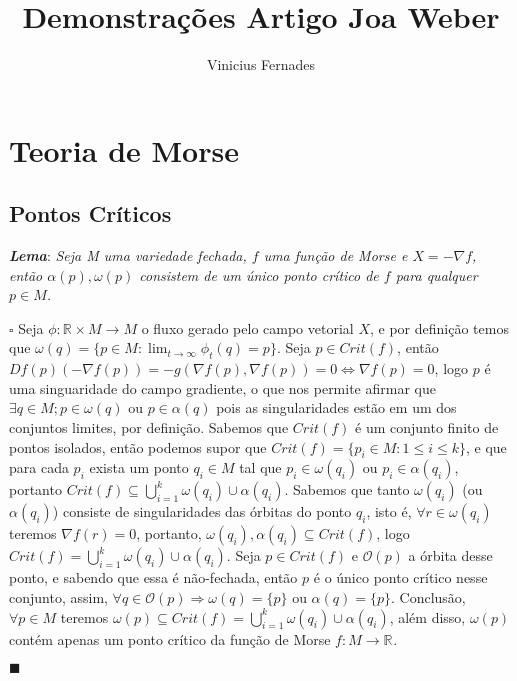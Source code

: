 \documentclass[12pt]{book}
\newcommand{\real}[1]{\mathbb{R}^{#1}}
\newcommand{\tese}[3]{\vspace{2mm} \textit{\textbf{#1}}: \textit{#2} \par $\square$ #3 \par $\blacksquare$}
\begin{document}
	
	\title{Demonstrações Artigo Joa Weber}
	
	\author{Vinicius Fernades}
	
	\maketitle
	
	
	\vspace{8mm}
	\chapter{Teoria de Morse}
	
	\section{Pontos Críticos}
	
	\tese{Lema}{Seja M uma variedade fechada, $f$ uma função de Morse e $X = -\nabla f$, então $\alpha(p), \omega(p)$ consistem de um único ponto crítico de $f$ para qualquer $p \in M$.}
	{Seja $\phi: \real{} \times M \to M$ o fluxo gerado pelo campo vetorial $X$, e por definição temos que $\omega(q) = \{p \in M: \lim_{t \to \infty}\phi_{t}(q) = p \}$. Seja $p \in Crit(f)$, então $Df(p)(-\nabla f(p)) = -g(\nabla f(p), \nabla f(p)) = 0 \iff \nabla f(p) = 0$, logo $p$ é uma singuaridade do campo gradiente, o que nos permite afirmar que $\exists q \in M; p \in  \omega(q)$ ou $p \in  \alpha(q)$ pois as singularidades estão em um dos conjuntos limites, por definição. Sabemos que $Crit(f)$ é um conjunto finito de pontos isolados, então podemos supor que $Crit(f) = \{p_{i} \in M : 1\leq i \leq k \}$, e que para cada $p_{i}$ exista um ponto $q_{i} \in M$ tal que $p_{i} \in \omega(q_{i})$ ou $p_{i} \in \alpha(q_{i})$, portanto $Crit(f) \subseteq \bigcup_{i=1}^{k}\omega(q_{i}) \cup \alpha(q_{i})$. Sabemos que tanto $\omega(q_{i})$ (ou $\alpha(q_{i})$) consiste de singularidades das órbitas do ponto $q_{i}$, isto é, $\forall r \in \omega(q_{i})$ teremos $\nabla f(r) = 0$, portanto, $\omega(q_{i}), \alpha(q_{i}) \subseteq Crit(f)$, logo $Crit(f) = \bigcup_{i=1}^{k}\omega(q_{i}) \cup \alpha(q_{i})$. Seja $p \in Crit(f)$ e $\mathcal{O}(p)$ a órbita desse ponto, e sabendo que essa é não-fechada, então $p$ é o único ponto crítico nesse conjunto, assim, $\forall q \in \mathcal{O}(p) \Rightarrow \omega(q) = \{p\}$ ou $\alpha(q) = \{p\}$. Conclusão, $\forall p \in M$ teremos $\omega(p) \subseteq Crit(f) = \bigcup_{i=1}^{k}\omega(q_{i}) \cup \alpha(q_{i})$, além disso, $\omega(p)$ contém apenas um ponto crítico da função de Morse $f:M \to \real{}$.}
\end{document}
